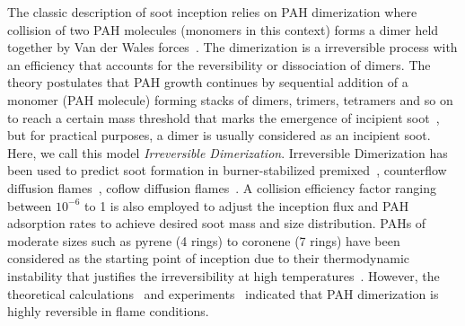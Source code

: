 The classic description of soot inception relies on PAH dimerization where collision of two PAH molecules (monomers in this context) forms a dimer held together by Van der Wales forces~\citep{frenklach1991detailed}. The dimerization is a irreversible process with an efficiency that accounts for the reversibility or dissociation of dimers. The theory postulates that PAH growth continues by sequential addition of a monomer (PAH molecule) forming stacks of dimers, trimers, tetramers and so on to reach a certain mass threshold that marks the emergence of incipient soot~\citep{frenklach1991detailed}, but for practical purposes, a dimer is usually considered as an incipient soot. Here, we call this model \textit{Irreversible Dimerization}. 
Irreversible Dimerization has been used to predict soot formation in burner-stabilized premixed~\citep{salenbauch2015modeling, desgroux2017comparative}, counterflow diffusion flames~\citep{wang2015soot, xu2021experimental}, coflow diffusion flames~\citep{kholghy2016core, veshkini2016understanding}. A collision efficiency factor ranging between $10^{-6}$ to 1 is also employed to adjust the inception flux and PAH adsorption rates to achieve desired soot mass and size distribution. PAHs of moderate sizes such as pyrene (4 rings) to coronene (7 rings) have been considered as the starting point of inception due to their thermodynamic instability that justifies the irreversibility at high temperatures~\citep{frenklach1991detailed}. However, the theoretical calculations~\citep{miller1985calculations} and experiments~\citep{sabbah2010exploring} indicated that PAH dimerization is highly reversible in flame conditions.







